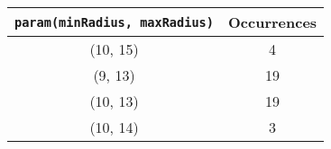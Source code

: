 \documentclass[letterpaper, 12pt]{article}
\begin{document}
\begin{longtable}{|c|c|}
\hline
\textbf{\texttt{param(minRadius, maxRadius)}} & \textbf{Occurrences} \\
\hline
(10, 15) & 4 \\
\hline
(9, 13) & 19 \\
\hline
(10, 13) & 19 \\
\hline
(10, 14) & 3 \\
\hline
\end{longtable}
\end{document}
